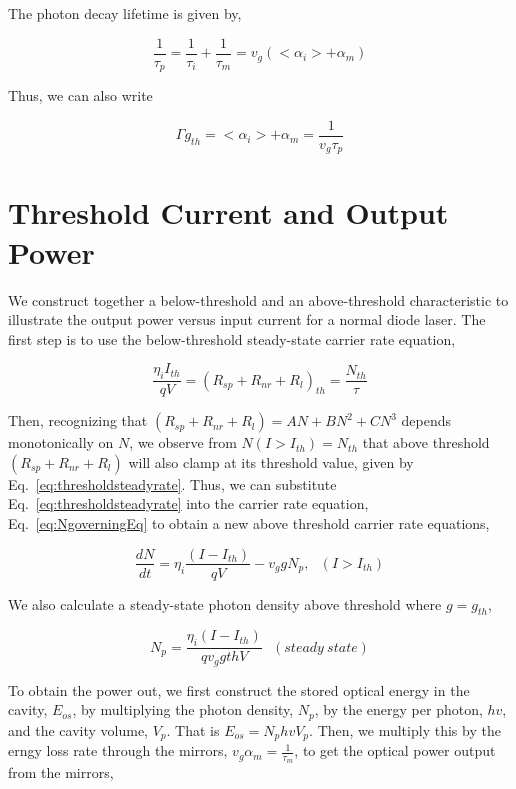 The photon decay lifetime is given by,

\begin{equation}
  \frac{1}{\tau_p} = \frac{1}{\tau_i} + \frac{1}{\tau_m} = v_g(<\alpha_i> + \alpha_m)
\end{equation}

Thus, we can also write

\begin{equation}
  \Gamma g_{th} = <\alpha_i> + \alpha_m = \frac{1}{v_g\tau_p}
\end{equation}

\section[Threshold Output Power]{Threshold Current and Output Power}
\label{sec:threshold_current_and_power_out_versus_current}

We construct together a below-threshold and an above-threshold characteristic
to illustrate the output power versus input current for a normal diode laser.
The first step is to use the below-threshold steady-state carrier rate
equation,

\begin{equation}
  \frac{\eta_{i}I_{th}}{qV} = {(R_{sp} + R_{nr} + R_{l})}_{th} = \frac{N_{th}}{\tau}
  \label{eq:thresholdsteadyrate}
\end{equation}

Then, recognizing that $(R_{sp} + R_{nr} + R_{l}) = AN + BN^2 +CN^3$ depends
monotonically on $N$, we observe from $N(I > I_{th}) = N_{th}$ that above
threshold $(R_{sp} + R_{nr} + R_{l})$ will also clamp at its threshold value,
given by Eq.~\ref{eq:thresholdsteadyrate}. Thus, we can substitute
Eq.~\ref{eq:thresholdsteadyrate} into the carrier rate equation,
Eq.~\ref{eq:NgoverningEq} to obtain a new above threshold carrier rate
equations,

\begin{equation}
  \frac{dN}{dt} = \eta_i \frac{(I - I_{th})}{qV} - v_{g}gN_p,~~~   (I > I_{th})
\end{equation}

We also calculate a steady-state photon density above threshold where $g =
g_{th}$,

\begin{equation}
  N_p = \frac{\eta_i (I - I_{th})}{qv_{g}g{th}V}~~~   (steady~ state)
\end{equation}

To obtain the power out, we first construct the stored optical energy in the
cavity, $E_{os}$, by multiplying the photon density, $N_p$, by the energy per
photon, $hv$, and the cavity volume, $V_p$. That is $E_{os} = N_phvV_p$. Then,
we multiply this by the erngy loss rate through the mirrors, $v_g\alpha_m =
\frac{1}{\tau_m}$, to get the optical power output from the mirrors,

